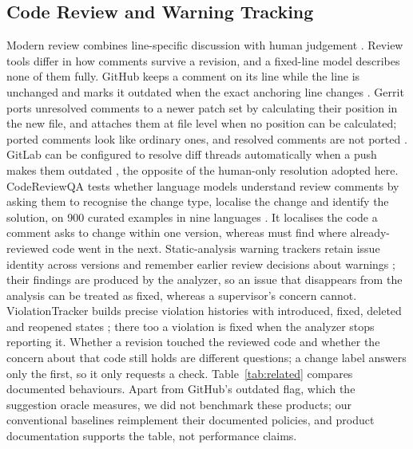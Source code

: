 \subsection{Code Review and Warning Tracking}
Modern review combines line-specific discussion with human judgement \cite{bacchelli2013expectations,sadowski2018modern}. Review tools differ in how comments survive a revision, and a fixed-line model describes none of them fully. GitHub keeps a comment on its line while the line is unchanged and marks it outdated when the exact anchoring line changes \cite{github2018outdating}. Gerrit ports unresolved comments to a newer patch set by calculating their position in the new file, and attaches them at file level when no position can be calculated; ported comments look like ordinary ones, and resolved comments are not ported \cite{gerritporting}. GitLab can be configured to resolve diff threads automatically when a push makes them outdated \cite{gitlabautoresolve}, the opposite of the human-only resolution adopted here. CodeReviewQA tests whether language models understand review comments by asking them to recognise the change type, localise the change and identify the solution, on 900 curated examples in nine languages \cite{lin2025codereviewqa}. It localises the code a comment asks to change within one version, whereas \sys{} must find where already-reviewed code went in the next. Static-analysis warning trackers retain issue identity across versions and remember earlier review decisions about warnings \cite{avgustinov2015tracking,li2024tracking,spacco2006tracking,sonarqube}; their findings are produced by the analyzer, so an issue that disappears from the analysis can be treated as fixed, whereas a supervisor's concern cannot. ViolationTracker builds precise violation histories with introduced, fixed, deleted and reopened states \cite{yu2023violationtracker}; there too a violation is fixed when the analyzer stops reporting it. Whether a revision touched the reviewed code and whether the concern about that code still holds are different questions; a \sys{} change label answers only the first, so it only requests a check. Table~\ref{tab:related} compares documented behaviours. Apart from GitHub's outdated flag, which the suggestion oracle measures, we did not benchmark these products; our conventional baselines reimplement their documented policies, and product documentation supports the table, not performance claims.

